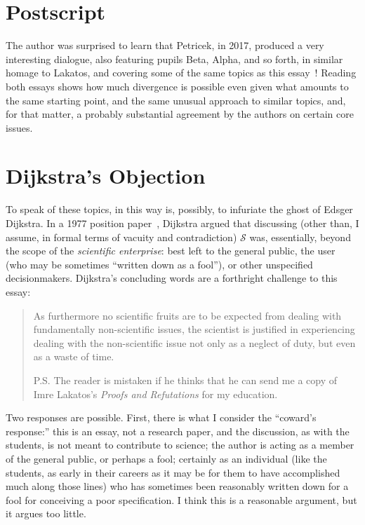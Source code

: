 \documentclass[sigplan]{acmart}
\begin{document}
\section{Postscript}

The author was surprised to learn that Petricek, in 2017,
produced a very interesting dialogue, also featuring pupils Beta, Alpha, and so forth, in
similar homage to Lakatos, and covering some of the same topics as
this essay~\cite{DBLP:journals/programming/000117}!  Reading both
essays shows how much divergence is possible even given what amounts
to the same starting point, and the same unusual approach to similar
topics, and, for that matter, a probably substantial agreement by the
authors on certain core issues.

\section{Dijkstra's Objection}

To speak of these topics, in this way is, possibly, to infuriate the
ghost of Edsger Dijkstra.  In a 1977 position paper~\cite{dijkstra1977position}, Dijkstra argued
that discussing (other than, I assume, in formal terms of vacuity and
contradiction) $\mathcal{S}$ was, essentially, beyond the scope of the
\emph{scientific enterprise}:  best left to the general public, the
user (who may be sometimes ``written down as a fool''), or other
unspecified decisionmakers.  Dijkstra's concluding words are a
forthright challenge to this essay:

\begin{quote}
  As furthermore no scientific fruits are to be expected from dealing with fundamentally non-scientific issues, the scientist is justified in experiencing dealing with the non-scientific issue not only as a neglect of duty, but even as a waste of time.

P.S. The reader is mistaken if he thinks that he can send me a copy of Imre Lakatos’s \emph{Proofs and Refutations} for my education.
\end{quote}

Two responses are possible.  First, there is what I consider the
``coward's response:''  this is an essay, not a research paper, and
the discussion, as with the students, is not meant to contribute to
science; the author is acting as a member of the general public, or perhaps a fool;
certainly as an individual (like the students, as early in their
careers as it may be for them to have accomplished much along those
lines) who has sometimes been reasonably written down for a fool for
conceiving a poor specification.  I think this is a reasonable
argument, but it argues
too little.
\end{document}
